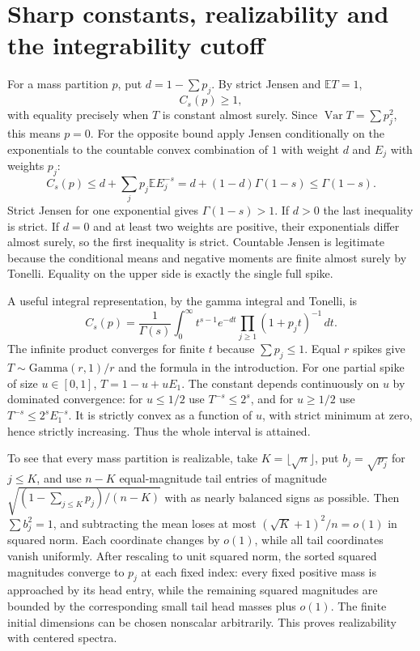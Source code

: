 \documentclass[11pt]{article}
\newcommand{\E}{\mathbb E}
\begin{document}
\section{Sharp constants, realizability and the integrability cutoff}
For a mass partition $p$, put $d=1-\sum p_j$. By strict Jensen and $\E T=1$,
\[
 C_s(p)\ge1,
\]
with equality precisely when $T$ is constant almost surely. Since $\operatorname{Var}T=\sum p_j^2$, this means $p=0$. For the opposite bound apply Jensen conditionally on the exponentials to the countable convex combination of $1$ with weight $d$ and $E_j$ with weights $p_j$:
\[
 C_s(p)\le d+\sum_jp_j\E E_j^{-s}=d+(1-d)\Gamma(1-s)\le\Gamma(1-s).
\]
Strict Jensen for one exponential gives $\Gamma(1-s)>1$. If $d>0$ the last inequality is strict. If $d=0$ and at least two weights are positive, their exponentials differ almost surely, so the first inequality is strict. Countable Jensen is legitimate because the conditional means and negative moments are finite almost surely by Tonelli. Equality on the upper side is exactly the single full spike.

A useful integral representation, by the gamma integral and Tonelli, is
\begin{equation}
 C_s(p)=\frac1{\Gamma(s)}\int_0^\infty t^{s-1}e^{-dt}\prod_{j\ge1}(1+p_jt)^{-1}\,dt.
\label{eq:integral}
\end{equation}
The infinite product converges for finite $t$ because $\sum p_j\le1$. Equal $r$ spikes give $T\sim\mathrm{Gamma}(r,1)/r$ and the formula in the introduction. For one partial spike of size $u\in[0,1]$, $T=1-u+uE_1$. The constant depends continuously on $u$ by dominated convergence: for $u\le1/2$ use $T^{-s}\le2^s$, and for $u\ge1/2$ use $T^{-s}\le2^s E_1^{-s}$. It is strictly convex as a function of $u$, with strict minimum at zero, hence strictly increasing. Thus the whole interval is attained.

To see that every mass partition is realizable, take $K=\lfloor\sqrt n\rfloor$, put $b_j=\sqrt{p_j}$ for $j\le K$, and use $n-K$ equal-magnitude tail entries of magnitude $\sqrt{(1-\sum_{j\le K}p_j)/(n-K)}$ with as nearly balanced signs as possible. Then $\sum b_j^2=1$, and subtracting the mean loses at most $(\sqrt K+1)^2/n=o(1)$ in squared norm. Each coordinate changes by $o(1)$, while all tail coordinates vanish uniformly. After rescaling to unit squared norm, the sorted squared magnitudes converge to $p_j$ at each fixed index: every fixed positive mass is approached by its head entry, while the remaining squared magnitudes are bounded by the corresponding small tail head masses plus $o(1)$. The finite initial dimensions can be chosen nonscalar arbitrarily. This proves realizability with centered spectra.
\end{document}

